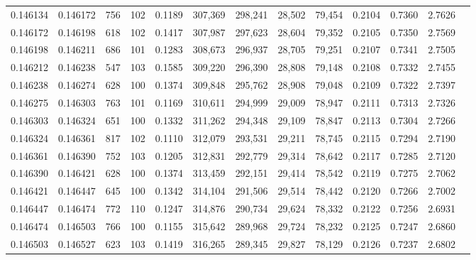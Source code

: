 \begin{tabular}{rrrrrrrrrrrrr}
0.146134 & 0.146172 &   756 & 102 &                                     0.1189 & 307,369 & 298,241 &  28,502 &  79,454 & 0.2104 & 0.7360 & 2.7626 \\
0.146172 & 0.146198 &   618 & 102 &                                     0.1417 & 307,987 & 297,623 &  28,604 &  79,352 & 0.2105 & 0.7350 & 2.7569 \\
0.146198 & 0.146211 &   686 & 101 &                                     0.1283 & 308,673 & 296,937 &  28,705 &  79,251 & 0.2107 & 0.7341 & 2.7505 \\
0.146212 & 0.146238 &   547 & 103 &                                     0.1585 & 309,220 & 296,390 &  28,808 &  79,148 & 0.2108 & 0.7332 & 2.7455 \\
0.146238 & 0.146274 &   628 & 100 &                                     0.1374 & 309,848 & 295,762 &  28,908 &  79,048 & 0.2109 & 0.7322 & 2.7397 \\
0.146275 & 0.146303 &   763 & 101 &                                     0.1169 & 310,611 & 294,999 &  29,009 &  78,947 & 0.2111 & 0.7313 & 2.7326 \\
0.146303 & 0.146324 &   651 & 100 &                                     0.1332 & 311,262 & 294,348 &  29,109 &  78,847 & 0.2113 & 0.7304 & 2.7266 \\
0.146324 & 0.146361 &   817 & 102 &                                     0.1110 & 312,079 & 293,531 &  29,211 &  78,745 & 0.2115 & 0.7294 & 2.7190 \\
0.146361 & 0.146390 &   752 & 103 &                                     0.1205 & 312,831 & 292,779 &  29,314 &  78,642 & 0.2117 & 0.7285 & 2.7120 \\
0.146390 & 0.146421 &   628 & 100 &                                     0.1374 & 313,459 & 292,151 &  29,414 &  78,542 & 0.2119 & 0.7275 & 2.7062 \\
0.146421 & 0.146447 &   645 & 100 &                                     0.1342 & 314,104 & 291,506 &  29,514 &  78,442 & 0.2120 & 0.7266 & 2.7002 \\
0.146447 & 0.146474 &   772 & 110 &                                     0.1247 & 314,876 & 290,734 &  29,624 &  78,332 & 0.2122 & 0.7256 & 2.6931 \\
0.146474 & 0.146503 &   766 & 100 &                                     0.1155 & 315,642 & 289,968 &  29,724 &  78,232 & 0.2125 & 0.7247 & 2.6860 \\
0.146503 & 0.146527 &   623 & 103 &                                     0.1419 & 316,265 & 289,345 &  29,827 &  78,129 & 0.2126 & 0.7237 & 2.6802 \\

\end{tabular}
